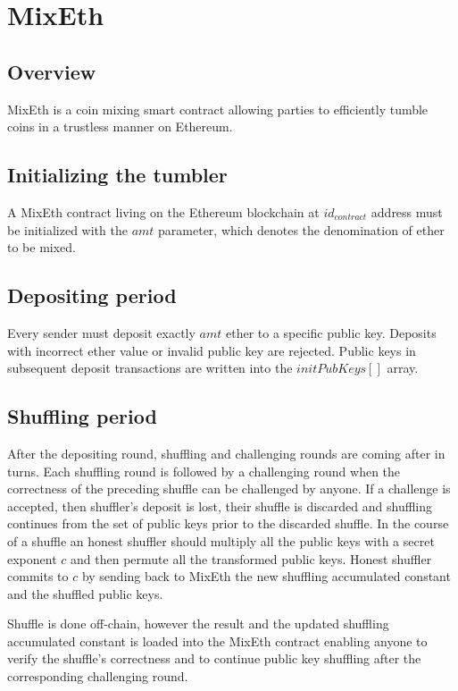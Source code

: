 \documentclass[a4paper]{article}
\theoremstyle{definition}
\begin{document}
\section{MixEth}

\subsection{Overview}
MixEth is a coin mixing smart contract allowing parties to efficiently tumble coins in a trustless manner on Ethereum.
\subsection{Initializing the tumbler}

A MixEth contract living on the Ethereum blockchain at $id_{contract}$ address must be initialized with the $amt$ parameter, which denotes the denomination of ether to be mixed.

\subsection{Depositing period}
Every sender must deposit exactly $amt$ ether to a specific public key. Deposits with incorrect ether value or invalid public key are rejected. Public keys in subsequent deposit transactions are written into the $initPubKeys[]$ array.   

\subsection{Shuffling period}
After the depositing round, shuffling and challenging rounds are coming after in turns. Each shuffling round is followed by a challenging round when the correctness of the preceding shuffle can be challenged by anyone. If a challenge is accepted, then shuffler's deposit is lost, their shuffle is discarded and shuffling continues from the set of public keys prior to the discarded shuffle. In the course of a shuffle an honest shuffler should multiply all the public keys with a secret exponent $c$ and then permute all the transformed public keys. Honest shuffler commits to $c$ by sending back to MixEth the new shuffling accumulated constant and the shuffled public keys.

Shuffle is done off-chain, however the result and the updated shuffling accumulated constant is loaded into the MixEth contract enabling anyone to verify the shuffle's correctness and to continue public key shuffling after the corresponding challenging round.
\end{document}
